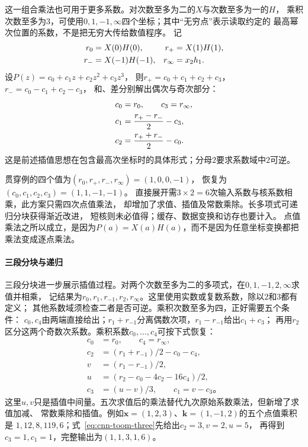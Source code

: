这一组合乘法也可用于更多系数。对次数至多为二的$X$与次数至多为一的$H$，
乘积次数至多为$3$，可使用$0,1,-1,\infty$四个坐标；其中“无穷点”表示读取约定的
最高幂次位置的系数，不是把无穷大传给数值程序。
记
\begin{align}
  r_0&=X(0)H(0),&r_+&=X(1)H(1),\notag\\
  r_-&=X(-1)H(-1),&r_\infty&=x_2h_1.\label{eq:cnn-toom-three-two-evaluation}
\end{align}
设$P(z)=c_0+c_1z+c_2z^2+c_3z^3$，
则$r_+=c_0+c_1+c_2+c_3$，$r_-=c_0-c_1+c_2-c_3$，
和、差分别解出偶次与奇次部分：
\begin{align}
  c_0&=r_0,\qquad c_3=r_\infty,\notag\\
  c_1&=\frac{r_+-r_-}{2}-c_3,\notag\\
  c_2&=\frac{r_++r_-}{2}-c_0.
  \label{eq:signal-analysis-toom-reconstruction}
\end{align}
\BookEquationAliases{\label{eq:cnn-toom-three-two-recovery}}
这是前述插值思想在包含最高次坐标时的具体形式；分母$2$要求系数域中$2$可逆。

贯穿例的四个值为$(r_0,r_+,r_-,r_\infty)=(1,0,0,-1)$，
恢复为$(c_0,c_1,c_2,c_3)=(1,1,-1,-1)$。
直接展开需$3\times2=6$次输入系数与核系数相乘，此方案只需四次点值乘法，
却增加了求值、插值及常数乘除。长多项式可递归分块获得渐近改进，
短核则未必值得；缓存、数据变换和访存也要计入。
点值乘法之所以成立，是因为$P(a)=X(a)H(a)$，而不是因为任意坐标变换都把乘法变成逐点乘法。

\paragraph{三段分块与递归}

三段分块进一步展示插值过程。对两个次数至多为二的多项式，在$0,1,-1,2,\infty$求值并相乘，
记结果为$r_0,r_1,r_{-1},r_2,r_\infty$。这里使用实数或复数系数，除以$2$和$3$都有定义；
其他系数域须检查二者是否可逆。乘积次数至多为四，正好需要五个条件：
$c_0,c_4$由两端直接给出；$r_1+r_{-1}$分离偶数次项，$r_1-r_{-1}$给出$c_1+c_3$；
再用$r_2$区分这两个奇数次系数。乘积系数$c_0,\ldots,c_4$可按下式恢复：
\begin{equation}
  \begin{aligned}
    c_0&=r_0,\qquad c_4=r_\infty,\\
    c_2&=(r_1+r_{-1})/2-c_0-c_4,\\
    v&=(r_1-r_{-1})/2,\\
    u&=(r_2-c_0-4c_2-16c_4)/2,\\
    c_3&=(u-v)/3,\qquad c_1=v-c_3\text{。}
  \end{aligned}
  \label{eq:cnn-toom-three}
\end{equation}
这里$u,v$只是插值中间量。五次求值后的乘法替代九次原始系数乘法，但新增了求值加减、
常数乘除和插值。例如$\bm x=(1,2,3)$、$\bm k=(1,-1,2)$的五个点值乘积是
$1,12,8,119,6$；式~\eqref{eq:cnn-toom-three}先给出$c_2=3,v=2,u=5$，
再得到$c_3=1,c_1=1$，完整输出为$(1,1,3,1,6)$。

